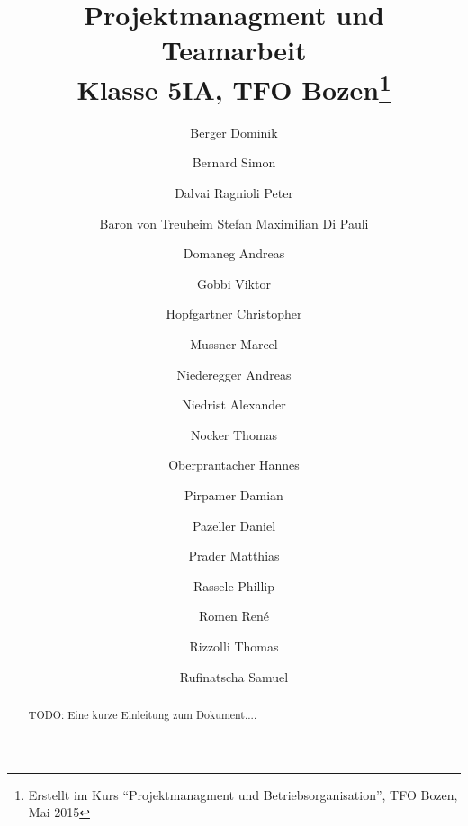\documentclass{article}
\title{Projektmanagment und Teamarbeit\\Klasse 5IA, TFO Bozen\thanks{Erstellt 
im Kurs ``Projektmanagment und Betriebsorganisation'', TFO Bozen, Mai 2015}}
\author{Berger Dominik
\and Bernard Simon
\and Dalvai Ragnioli Peter
\and Baron von Treuheim Stefan Maximilian Di Pauli
\and Domaneg Andreas
\and Gobbi Viktor
\and Hopfgartner Christopher
\and Mussner Marcel
\and Niederegger Andreas
\and Niedrist Alexander
\and Nocker Thomas
\and Oberprantacher Hannes
\and Pirpamer Damian
\and Pazeller Daniel
\and Prader Matthias
\and Rassele Phillip
\and Romen René
\and Rizzolli Thomas
\and Rufinatscha Samuel}
\begin{document}
\maketitle


\begin{abstract}
 TODO: Eine kurze Einleitung zum Dokument....
\end{abstract}

\newpage


\begin{sloppypar}
\tableofcontents
\listoffigures






















\end{sloppypar}
\end{document}
